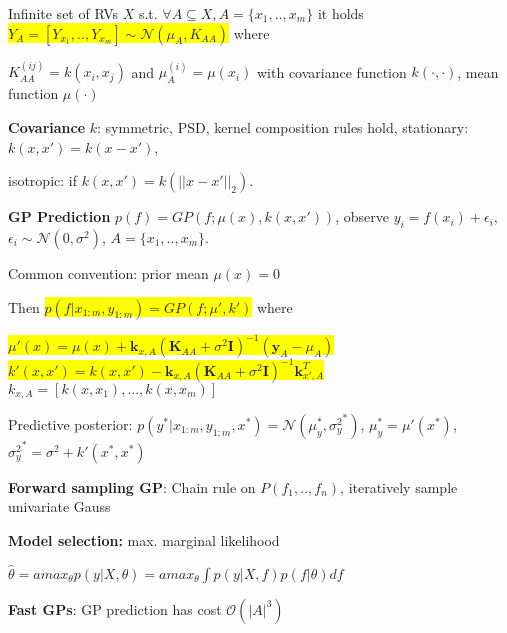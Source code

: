 \documentclass[11pt,landscape,a4paper,fleqn]{article}
\newcommand{\mhl}[1]{\setlength{\fboxsep}{0pt}\colorbox{yellow}{#1}}
\begin{document}
\begin{multicols*}{4}
Infinite set of RVs $X$ s.t. $\forall A \subseteq X, A = \{ x_1,.., x_m\}$
it holds \mhl{$Y_A = [Y_{x_1},..,Y_{x_m}] \sim \mathcal{N}(\mu_A, K_{AA})$} where

$K_{AA}^{(ij)} = k(x_i, x_j)$ and $\mu_A^{(i)} = \mu(x_i)$ with covariance function $k(\cdot, \cdot)$, mean function $\mu(\cdot)$


\textbf{Covariance} $k$: symmetric, PSD, kernel composition rules hold,
stationary: $k(x,x') = k(x - x')$,

isotropic: if $k(x,x') = k(||x - x'||_2)$.


\textbf{GP Prediction} $p(f) = GP(f; \mu(x), k(x,x'))$, observe $y_i = f(x_i) + \epsilon_i$, $\epsilon_i \sim \mathcal{N}(0, \sigma^2)$, \mbox{\fontsize{9.2}{6}\selectfont $A = \{x_1,..,x_m\}$}.

Common convention: prior mean $\mu(x) = 0$

Then \mhl{$p(f | x_{1:m}, y_{1:m}) = GP(f; \mu', k')$} where

\mhl{$\mu'(x) = \mu(x) + \mathbf{k}_{x,A} (\mathbf{K}_{AA} + \sigma^2 \mathbf{I})^{-1} (\mathbf{y}_A - \mu_A)$}
\mhl{$k'(x,x') = k(x, x') - \mathbf{k}_{x,A} (\mathbf{K}_{AA} + \sigma^2 \mathbf{I})^{-1} \mathbf{k}_{x',A}^T$}
$k_{x,A} = [k(x, x_1),..., k(x, x_m)]$

Predictive posterior: $p(y^* | x_{1:m}, y_{1:m},x^*) = \mathcal{N}(\mu_y^*, {\sigma_y^2}^*)$, $\mu_y^* = \mu'(x^*)$, ${\sigma_y^2}^* = \sigma^2 + k'(x^*, x^*)$

\textbf{Forward sampling GP}: Chain rule on $P(f_1,..,f_n)$, iteratively sample univariate Gauss

\textbf{Model selection:} max. marginal likelihood

$\hat{\theta} = amax_\theta p(y | X, \theta) = amax_\theta \int p(y | X,f) p(f | \theta) df$




\textbf{Fast GPs}: GP prediction has cost $\mathcal{O}(|A|^3)$


\end{multicols*}
\end{document}
